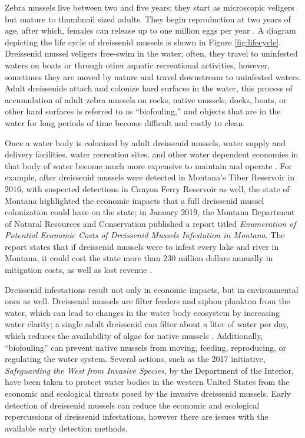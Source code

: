 \documentclass[12pt]{article}\usepackage[]{graphicx}\usepackage[]{color}
\begin{document}
Zebra mussels live between two and five years; they start as microscopic veligers but mature to thumbnail sized adults. They begin reproduction at two years of age, after which, females can release up to one million eggs per year \cite{NPS}. A diagram depicting the life cycle of dreissenid mussels is shown in Figure \ref{fig:lifecycle}. Dreissenid mussel veligers free-swim in the water; often, they travel to uninfested waters on boats or through other aquatic recreational activities, however, sometimes they are moved by nature and travel downstream to uninfested waters. Adult dreissenids attach and colonize hard surfaces in the water, this process of accumulation of adult zebra mussels on rocks, native mussels, docks, boats, or other hard surfaces is referred to as ``biofouling,'' and objects that are in the water for long periods of time become difficult and costly to clean.

Once a water body is colonized by adult dreissenid mussels, water supply and delivery facilities, water recreation sites, and other water dependent economies in that body of water become much more expensive to maintain and operate \cite{BOR}. For example, after dreissenid mussels were detected in Montana's Tiber Reservoir in 2016, with suspected detections in Canyon Ferry Reservoir as well, the state of Montana highlighted the economic impacts that a full dreissenid mussel colonization could have on the state; in January 2019, the Montana Department of Natural Resources and Conservation published a report titled \textit{Enumeration of Potential Economic Costs of Dreissenid Mussels Infestation in Montana}. The report states that if dreissenid mussels were to infest every lake and river in Montana, it could cost the state more than 230 million dollars annually in mitigation costs, as well as lost revenue \cite{MT}. 

Dreissenid infestations result not only in economic impacts, but in environmental ones as well. Dreissenid mussels are filter feeders and siphon plankton from the water, which can lead to changes in the water body ecosystem by increasing water clarity; a single adult dreissenid can filter about a liter of water per day, which reduces the availability of algae for native mussels \cite{BOR}. Additionally, ``biofouling'' can prevent native mussels from moving, feeding, reproducing, or regulating the water system. Several actions, such as the 2017 initiative, \textit{Safeguarding the West from Invasive Species}, by the Department of the Interior, have been taken to protect water bodies in the western United States from the economic and ecological threats posed by the invasive dreissenid mussels. Early detection of dreissenid mussels can reduce the economic and ecological repercussions of dreissenid infestations, however there are issues with the available early detection methods. 
\end{document}
